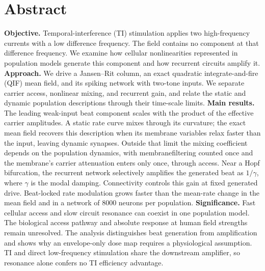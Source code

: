 \documentclass[11pt,a4paper]{article}
\newif\ifjne
\providecommand{\DIFaddtex}[1]{{\protect\color{blue} \sf #1}} %
\providecommand{\DIFdeltex}[1]{{\protect\color{red} \scriptsize #1}} %
\providecommand{\DIFaddbegin}{} %
\providecommand{\DIFaddend}{} %
\providecommand{\DIFdelbegin}{} %
\providecommand{\DIFdelend}{} %
\providecommand{\DIFadd}[1]{\texorpdfstring{\DIFaddtex{#1}}{#1}} %
\providecommand{\DIFdel}[1]{\texorpdfstring{\DIFdeltex{#1}}{}} %
\begin{document}
\section*{Abstract}
\ifjne
\noindent
\textbf{Objective.} Temporal-interference (TI) stimulation applies two high-frequency
currents with a low difference frequency. The field contains no component at that
difference frequency. We examine how cellular nonlinearities represented in population
models generate this component and how recurrent circuits amplify it.
\textbf{Approach.} We drive a Jansen--Rit column, an exact quadratic integrate-and-fire
(QIF) mean field, and its spiking network with two-tone inputs. We separate carrier
access, nonlinear mixing, and recurrent gain, and relate the static and dynamic
population descriptions through their time-scale limits.
\textbf{Main results.} The leading weak-input beat component scales with the product
of the effective carrier amplitudes. A static rate curve mixes through its curvature;
the exact mean field recovers this description when its membrane variables relax faster
than the input, leaving dynamic synapses. Outside that limit the mixing coefficient
depends on the population dynamics, \DIFdelbegin \DIFdel{with membranefiltering counted once}\DIFdelend \DIFaddbegin \DIFadd{and the membrane's carrier attenuation enters
only once, through access}\DIFaddend . Near a Hopf
bifurcation, the recurrent network selectively amplifies the generated beat as
$1/\gamma$, where $\gamma$ is the modal damping. Connectivity controls this gain at
fixed generated drive. Beat-locked rate modulation grows faster than the mean-rate change
in the mean field and in a network of $8000$ neurons per population.
\textbf{Significance.} Fast cellular access and slow circuit resonance can coexist in
one population model. The biological access pathway and absolute response at human
field strengths remain unresolved. The analysis distinguishes beat generation from
amplification and shows why an envelope-only dose map requires a physiological
assumption. TI and direct low-frequency stimulation share the downstream amplifier,
so resonance alone confers no TI efficiency advantage.
\end{document}
